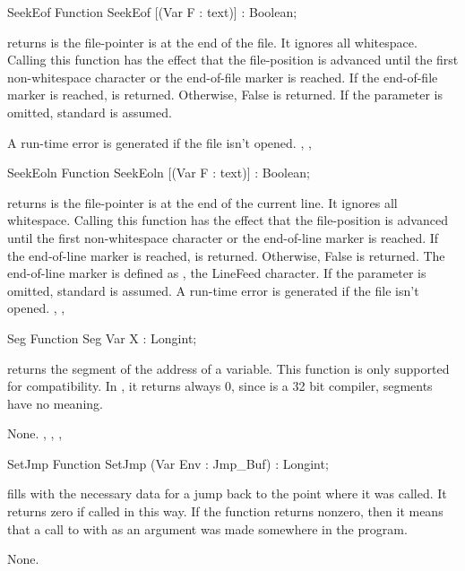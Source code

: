 \documentclass{report}
\begin{document}

\begin{function}{SeekEof}
\Declaration
Function SeekEof [(Var F : text)] : Boolean;

\Description
{} returns  is the file-pointer is at the end of the
file. It ignores all whitespace.
Calling this function has the effect that the file-position is advanced
until the first non-whitespace character or the end-of-file marker is
reached.
If the end-of-file marker is reached,  is returned. Otherwise,
False is returned.
If the parameter  is omitted, standard  is assumed.

\Errors
A run-time error is generated if the file  isn't opened.
\SeeAlso
{}, , 
\end{function}


\begin{function}{SeekEoln}
\Declaration
Function SeekEoln [(Var F : text)] : Boolean;

\Description
{} returns  is the file-pointer is at the end of the
current line. It ignores all whitespace.
Calling this function has the effect that the file-position is advanced
until the first non-whitespace character or the end-of-line marker is
reached.
If the end-of-line marker is reached,  is returned. Otherwise,
False is returned.
The end-of-line marker is defined as , the LineFeed character.
If the parameter  is omitted, standard  is assumed.
\Errors
A run-time error is generated if the file  isn't opened.
\SeeAlso
{}, , 
\end{function}


\begin{function}{Seg}
\Declaration
Function Seg Var X : Longint;

\Description
{} returns the segment of the address of a variable.
This function is only supported for compatibility. In \fpc, it
returns always 0, since \fpc is a 32 bit compiler, segments have no meaning.

\Errors
None.
\SeeAlso
{}, , , 
\end{function}


\begin{function}{SetJmp}
\Declaration
Function SetJmp (Var Env : Jmp\_Buf) : Longint;

\Description

 fills  with the necessary data for a jump back to the
point where it was called. It returns zero if called in this way.
If the function returns nonzero, then it means that a call to 
with  as an argument was made somewhere in the program.

\Errors
None.
\SeeAlso
{}
\end{function}
\end{document}
